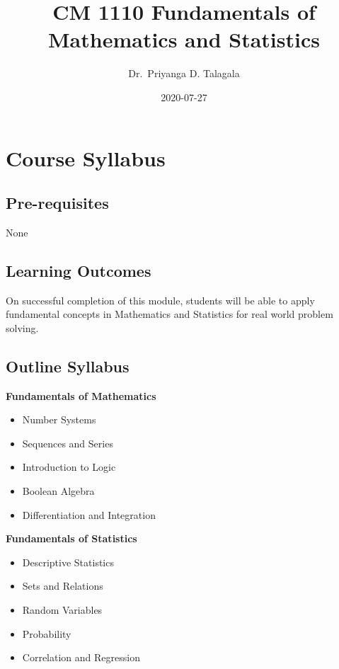 \documentclass[]{book}
\title{CM 1110 Fundamentals of Mathematics and Statistics}
\author{Dr.~Priyanga D. Talagala}
\date{2020-07-27}
\providecommand{\tightlist}{%
  \setlength{\itemsep}{0pt}\setlength{\parskip}{0pt}}
\begin{document}
\maketitle

{
\setcounter{tocdepth}{1}
\tableofcontents
}
\hypertarget{course-syllabus}{%
\chapter*{Course Syllabus}\label{course-syllabus}}

\hypertarget{pre-requisites}{%
\section*{Pre-requisites}\label{pre-requisites}}

None

\hypertarget{learning-outcomes}{%
\section*{Learning Outcomes}\label{learning-outcomes}}

On successful completion of this module, students will be able to apply fundamental concepts in Mathematics and Statistics for real world problem solving.

\hypertarget{outline-syllabus}{%
\section*{Outline Syllabus}\label{outline-syllabus}}

\textbf{Fundamentals of Mathematics}

\begin{itemize}
\tightlist
\item
  Number Systems
\item
  Sequences and Series
\item
  Introduction to Logic
\item
  Boolean Algebra
\item
  Differentiation and Integration
\end{itemize}

\textbf{Fundamentals of Statistics}

\begin{itemize}
\tightlist
\item
  Descriptive Statistics
\item
  Sets and Relations
\item
  Random Variables
\item
  Probability
\item
  Correlation and Regression
\end{itemize}
\end{document}
